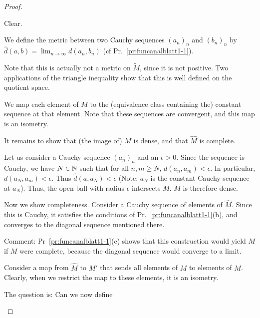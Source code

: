 \begin{proof}
	\begin{parts}
	\item Clear.
	\item We define the metric between two Cauchy sequences $(a_n)_n$ and $(b_n)_n$ by $\hat{d}(a, b)=\lim_{n \to \infty} d(a_n, b_n)$ (cf Pr.~\ref{pr:funcanalblatt1-1}).

		Note that this is actually not a metric on $\tilde{M}$, since it is not positive. Two applications of the triangle inequality show that this is well defined on the quotient space. 

		We map each element of $M$ to the (equivalence class containing the) constant sequence at that element. Note that these sequences are convergent, and this map is an isometry. 

		It remains to show that (the image of) $M$ is dense, and that $\hat{M}$ is complete. 

		Let us consider a Cauchy sequence $(a_n)_n$ and an $\epsilon>0$. Since the sequence is Cauchy, we have $N\in \mathbb{N}$ such that for all $n,m\ge N$, $d(a_n, a_m)<\epsilon$. In particular, $d(a_N, a_m)<\epsilon$. Thus $\hat{d}(a, a_N)<\epsilon$ (Note: $a_N$ is the constant Cauchy sequence at $a_N$). Thus, the open ball with radius $\epsilon$ intersects $M$. $M$ is therefore dense.

		Now we show completeness. Consider a Cauchy sequence of elements of $\hat{M}$. Since this is Cauchy, it satisfies the conditions of Pr.~\ref{pr:funcanalblatt1-1}(b), and converges to the diagonal sequence mentioned there.

		Comment: Pr~\ref{pr:funcanalblatt1-1}(c) shows that this construction would yield $M$ if $M$ were complete, because the diagonal sequence would converge to a limit.
	\item Consider a map from $\hat{M}$ to $M'$ that sends all elements of $M$ to elements of $M$. Clearly, when we restrict the map to these elements, it is an isometry. 

		The question is: Can we now define 
	\end{parts}
\end{proof}

